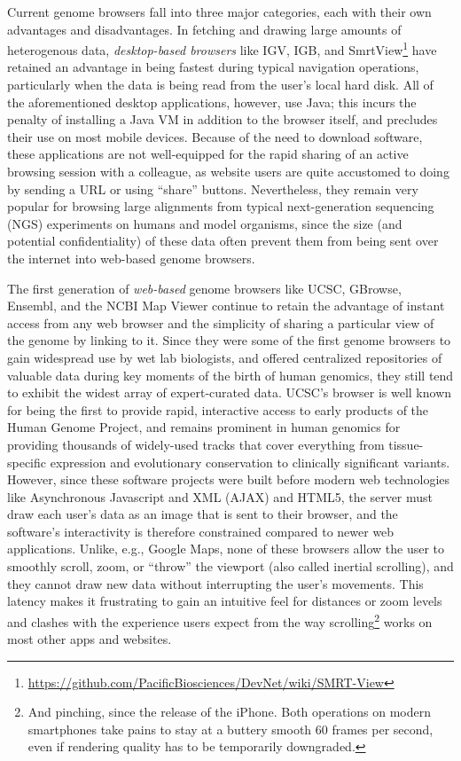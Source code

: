 Current genome browsers fall into three major categories, each with their own advantages and disadvantages. In fetching and drawing large amounts of heterogenous data, \emph{desktop-based browsers} like IGV,\autocite{Thorvaldsdottir2013} IGB,\autocite{Freese2016} and SmrtView\footnote{\url{https://github.com/PacificBiosciences/DevNet/wiki/SMRT-View}} have retained an advantage in being fastest during typical navigation operations, particularly when the data is being read from the user's local hard disk. All of the aforementioned desktop applications, however, use Java; this incurs the penalty of installing a Java VM in addition to the browser itself, and precludes their use on most mobile devices. Because of the need to download software, these applications are not well-equipped for the rapid sharing of an active browsing session with a colleague, as website users are quite accustomed to doing by sending a URL or using ``share'' buttons. Nevertheless, they remain very popular for browsing large alignments from typical next-generation sequencing (NGS) experiments on humans and model organisms, since the size (and potential confidentiality) of these data often prevent them from being sent over the internet into web-based genome browsers. 

The first generation of \emph{web-based} genome browsers like UCSC,\autocite{Dreszer2011} GBrowse,\autocite{Stein2002} Ensembl,\autocite{Stalker2004} and the NCBI Map Viewer\autocite{Wheeler2003} continue to retain the advantage of instant access from any web browser and the simplicity of sharing a particular view of the genome by linking to it. Since they were some of the first genome browsers to gain widespread use by wet lab biologists, and offered centralized repositories of valuable data during key moments of the birth of human genomics, they still tend to exhibit the widest array of expert-curated data. UCSC's browser is well known for being the first to provide rapid, interactive access to early products of the Human Genome Project,\autocite{Kent2002} and remains prominent in human genomics for providing thousands of widely-used tracks that cover everything from tissue-specific expression and evolutionary conservation to clinically significant variants. However, since these software projects were built before modern web technologies like Asynchronous Javascript and XML (AJAX)\autocite{Paulson2005} and HTML5, the server must draw each user's data as an image that is sent to their browser, and the software's interactivity is therefore constrained compared to newer web applications. Unlike, e.g., Google Maps, none of these browsers allow the user to smoothly scroll, zoom, or ``throw'' the viewport (also called inertial scrolling), and they cannot draw new data without interrupting the user's movements. This latency makes it frustrating to gain an intuitive feel for distances or zoom levels and clashes with the experience users expect from the way scrolling\footnote{And pinching, since the release of the iPhone. Both operations on modern smartphones take pains to stay at a buttery smooth 60 frames per second, even if rendering quality has to be temporarily downgraded.} works on most other apps and websites.

